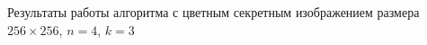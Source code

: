 \documentclass[a4paper,article,14pt]{extarticle}
\begin{document}
Результаты работы алгоритма с цветным секретным изображением размера $256\times256$, $n=4$, $k=3$

\begin{figure}[ph!]
    \begin{minipage}[h]{0.3\linewidth}
    \end{minipage}
    \hfill
    \begin{minipage}[h]{0.3\linewidth}

\end{minipage}
\end{figure}
\end{document}
